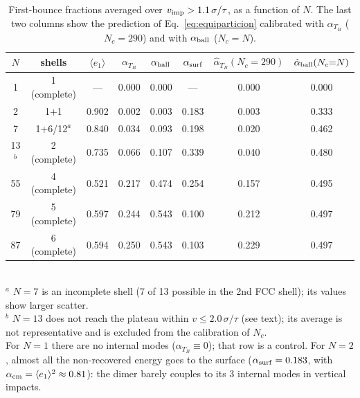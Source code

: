 \documentclass[aps,pre,twocolumn,reprint,superscriptaddress]{revtex4-2}
\begin{document}
\begin{table}[tp]
\centering
\caption{First-bounce fractions averaged over $v_{\rm imp}>1.1\,\sigma/\tau$,
as a function of $N$. The last two columns show the prediction of
Eq.~\eqref{eq:equiparticion} calibrated with $\alpha_{T_B}$ ($N_c=290$) and
with $\alpha_{\rm ball}$ ($N_c=N$).}
\label{tab:sweep_N}
\begin{tabular}{cccccccc}
\toprule
$N$ & shells & $\langle e_1\rangle$ & $\alpha_{T_B}$ & $\alpha_{\rm ball}$ &
$\alpha_{\rm surf}$ &
$\hat\alpha_{T_B}(N_c{=}290)$ & $\hat\alpha_{\rm ball}(N_c{=}N)$ \\
\midrule
 1 & 1 (complete) & — & 0.000 & 0.000 & —     & 0.000 & 0.000 \\
 2 & 1+1          & 0.902 & 0.002 & 0.003 & 0.183 & 0.003 & 0.333 \\
 7 & 1+6/12$^a$   & 0.840 & 0.034 & 0.093 & 0.198 & 0.020 & 0.462 \\
13$^b$ & 2 (complete) & 0.735 & 0.066 & 0.107 & 0.339 & 0.040 & 0.480 \\
55 & 4 (complete) & 0.521 & 0.217 & 0.474 & 0.254 & 0.157 & 0.495 \\
79 & 5 (complete) & 0.597 & 0.244 & 0.543 & 0.100 & 0.212 & 0.497 \\
87 & 6 (complete) & 0.594 & 0.250 & 0.543 & 0.103 & 0.229 & 0.497 \\
\bottomrule
\end{tabular}\\
\footnotesize $^a$ $N=7$ is an incomplete shell (7 of 13 possible in the
2nd FCC shell); its values show larger scatter.\\
\footnotesize $^b$ $N=13$ does not reach the plateau within
$v\leq2.0\,\sigma/\tau$ (see text); its average is not representative and
is excluded from the calibration of $N_c$.\\
\footnotesize For $N=1$ there are no internal modes
($\alpha_{T_B}\equiv0$); that row is a control. For $N=2$, almost all the
non-recovered energy goes to the surface ($\alpha_{\rm surf}=0.183$, with
$\alpha_{\rm cm}=\langle e_1\rangle^2\approx0.81$): the dimer barely
couples to its 3 internal modes in vertical impacts.
\end{table}
\end{document}
